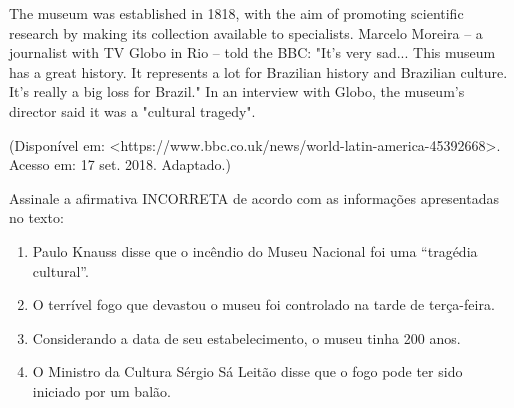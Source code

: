The museum was established in 1818, with the aim of promoting scientific research by making its collection available to specialists. Marcelo Moreira -- a journalist with TV Globo in Rio -- told the BBC: "It's very sad... This museum has a great history. It represents a lot for Brazilian history and Brazilian culture. It's really a big loss for Brazil." In an interview with Globo, the museum's director said it was a "cultural tragedy".

\begin{center}(Disponível em: <https://www.bbc.co.uk/news/world-latin-america-45392668>. Acesso em: 17 set. 2018. Adaptado.)\end{center}

Assinale a afirmativa INCORRETA de acordo com as informações apresentadas no texto:\begin{enumerate}
\item Paulo Knauss disse que o incêndio do Museu Nacional foi uma “tragédia cultural”.
\item O terrível fogo que devastou o museu foi controlado na tarde de terça-feira.
\item Considerando a data de seu estabelecimento, o museu tinha 200 anos.
\item O Ministro da Cultura Sérgio Sá Leitão disse que o fogo pode ter sido iniciado por um balão.\end{enumerate}
